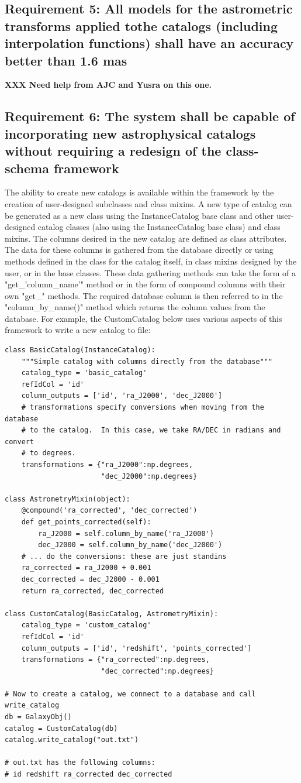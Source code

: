 \documentclass[]{article}
\begin{document}
\subsection{Requirement 5: All models for the astrometric transforms applied tothe catalogs (including interpolation functions) 
shall have an accuracy better than 1.6 mas}
{\bf XXX Need help from AJC and Yusra on this one.}
\subsection{Requirement 6: The system shall be capable of incorporating new astrophysical catalogs without requiring
a redesign of the class-schema framework}
The ability to create new catalogs is available within the framework by the creation of user-designed subclasses and class mixins. A new type of catalog can be generated as a new class using the InstanceCatalog base class and other user-designed catalog classes (also using the InstanceCatalog base class) and class mixins. The columns desired in the new catalog are defined as class attributes. The data for these columns is gathered from the database directly or using methods defined in the class
for the catalog itself, in class mixins designed by the user, or in the base classes. These data gathering methods can take the form of a "get\_'column\_name'" method or in the form of compound columns with their own "get\_" methods. The required database column is then referred to in the "column\_by\_name()" method which returns the column values from the database. For example, the CustomCatalog below uses various aspects of this framework to write a new catalog to file:

\begin{verbatim}
class BasicCatalog(InstanceCatalog):
    """Simple catalog with columns directly from the database"""
    catalog_type = 'basic_catalog'
    refIdCol = 'id'
    column_outputs = ['id', 'ra_J2000', 'dec_J2000']
    # transformations specify conversions when moving from the database
    # to the catalog.  In this case, we take RA/DEC in radians and convert
    # to degrees.
    transformations = {"ra_J2000":np.degrees,
                       "dec_J2000":np.degrees}

class AstrometryMixin(object):
    @compound('ra_corrected', 'dec_corrected')
    def get_points_corrected(self):
        ra_J2000 = self.column_by_name('ra_J2000')
        dec_J2000 = self.column_by_name('dec_J2000')
    # ... do the conversions: these are just standins
    ra_corrected = ra_J2000 + 0.001
    dec_corrected = dec_J2000 - 0.001
    return ra_corrected, dec_corrected

class CustomCatalog(BasicCatalog, AstrometryMixin):
    catalog_type = 'custom_catalog'
    refIdCol = 'id'
    column_outputs = ['id', 'redshift', 'points_corrected']
    transformations = {"ra_corrected":np.degrees,
                       "dec_corrected":np.degrees}

# Now to create a catalog, we connect to a database and call write_catalog
db = GalaxyObj()
catalog = CustomCatalog(db)
catalog.write_catalog("out.txt")

# out.txt has the following columns:
# id redshift ra_corrected dec_corrected
\end{verbatim}
\end{document}
